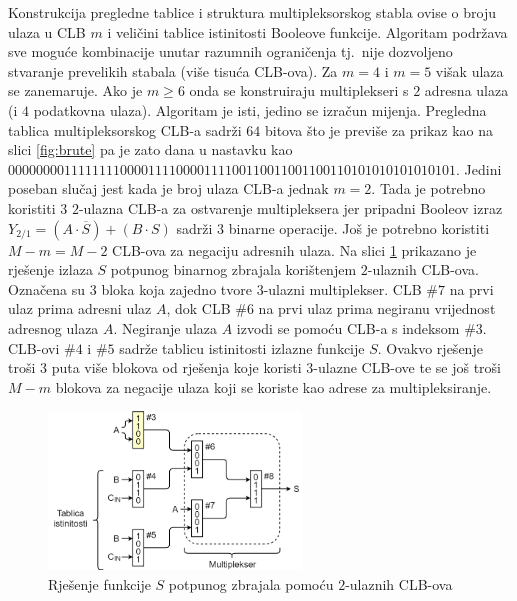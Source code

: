 \documentclass[times, utf8, diplomski]{fer}
\begin{document}
Konstrukcija pregledne tablice i struktura multipleksorskog stabla ovise o broju ulaza u CLB $m$ i veličini tablice istinitosti Booleove funkcije. Algoritam podržava sve moguće kombinacije unutar razumnih ograničenja tj.~nije dozvoljeno stvaranje prevelikih stabala (više tisuća CLB-ova). Za $m=4$ i $m=5$ višak ulaza se zanemaruje. Ako je $m \geq 6$ onda se konstruiraju multiplekseri s $2$ adresna ulaza (i $4$ podatkovna ulaza). Algoritam je isti, jedino se izračun mijenja. Pregledna tablica multipleksorskog CLB-a sadrži $64$ bitova što je previše za prikaz kao na slici \ref{fig:brute} pa je zato dana u nastavku kao $00000000111111110000111100001111 \allowbreak 00110011001100110101010101010101$. Jedini poseban slučaj jest kada je broj ulaza CLB-a jednak $m=2$. Tada je potrebno koristiti $3$ $2$-ulazna CLB-a za ostvarenje multipleksera jer pripadni Booleov izraz $Y_{2/1} = (A \cdot \overline{S}) + (B \cdot S)$ sadrži $3$ binarne operacije. Još je potrebno koristiti $M-m=M-2$ CLB-ova za negaciju adresnih ulaza. Na slici \ref{fig:full-adder-s} prikazano je rješenje izlaza $S$ potpunog binarnog zbrajala korištenjem $2$-ulaznih CLB-ova. Označena su $3$ bloka koja zajedno tvore $3$-ulazni multiplekser. CLB $\#7$ na prvi ulaz prima adresni ulaz $A$, dok CLB $\#6$ na prvi ulaz prima negiranu vrijednost adresnog ulaza $A$. Negiranje ulaza $A$ izvodi se pomoću CLB-a s indeksom $\#3$. CLB-ovi $\#4$ i $\#5$ sadrže tablicu istinitosti izlazne funkcije $S$. Ovakvo rješenje troši $3$ puta više blokova od rješenja koje koristi $3$-ulazne CLB-ove te se još troši $M-m$ blokova za negacije ulaza koji se koriste kao adrese za multipleksiranje.

\begin{figure}[htb]
	\centering
	\includegraphics[width=0.6\textwidth]{img/full_adder_s.png}
	\caption{Rješenje funkcije $S$ potpunog zbrajala pomoću $2$-ulaznih CLB-ova}
	\label{fig:full-adder-s}
\end{figure}
\end{document}
